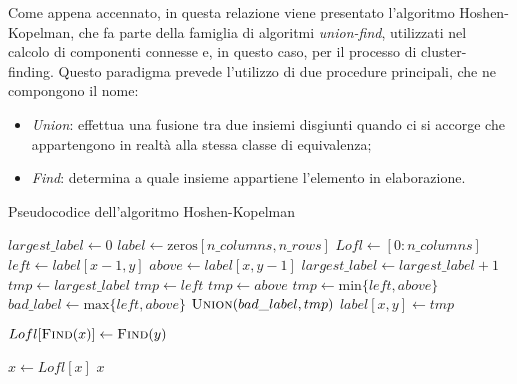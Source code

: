 Come appena accennato, in questa relazione viene presentato l'algoritmo 
Hoshen-Kopelman, che fa parte della famiglia di algoritmi \textit{union-find},
utilizzati nel calcolo di componenti connesse e, in questo caso, per il processo 
di cluster-finding. Questo paradigma prevede l'utilizzo di due procedure principali, che 
ne compongono il nome:
\begin{itemize}
    \item \textit{Union}: effettua una fusione tra due insiemi disgiunti quando ci 
    si accorge che appartengono in realtà alla stessa classe di equivalenza;
    \item \textit{Find}: determina a quale insieme appartiene l'elemento in elaborazione.
\end{itemize}

\begin{algorithm}
    \caption{Pseudocodice dell'algoritmo Hoshen-Kopelman}
    \label{alg:HK}
    {\small
    \begin{algorithmic}[1]
    \State $largest\_label \gets 0$
    \State $label \gets \text{zeros}[n\_columns, n\_rows]$
    \State $Lofl \gets [0:n\_columns]$
    \\
    \For{$[x,y] \gets [0,0]$ \textbf{to} $[n\_columns,n\_rows$}
            \State $left \gets label[x-1, y]$
            \State $above \gets label[x, y-1]$
                \State $largest\_label \gets largest\_label + 1$
                \State $tmp \gets largest\_label$
                \State $tmp \gets left$
                \State $tmp \gets above$
            \Else
                \State $tmp \gets \text{min}\{left,above\}$
                \State $bad\_label \gets \text{max}\{left,above\}$
                \State $\Call{Union}{bad\_label, tmp}$
            \EndIf
            \State $label[x,y] \gets tmp$
        \EndIf
    \EndFor
    
    \vspace{5pt}
        \State $Lofl[\Call{Find}{x}] \gets \Call{Find}{y}$
    \EndProcedure

    \vspace{5pt}
            \State $x \gets Lofl[x]$
        \EndWhile
        \State \Return $x$
    \EndFunction
    
    \end{algorithmic}
    }
\end{algorithm}

